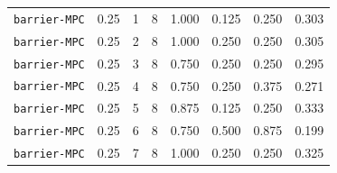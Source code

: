 \documentclass{article}
\begin{document}
\begin{center}
{\begin{tabular}{llllcccc}
\texttt{barrier-MPC} & 0.25 & 1 & 8 & 1.000 & 0.125 & 0.250 & 0.303 \\
\texttt{barrier-MPC} & 0.25 & 2 & 8 & 1.000 & 0.250 & 0.250 & 0.305 \\
\texttt{barrier-MPC} & 0.25 & 3 & 8 & 0.750 & 0.250 & 0.250 & 0.295 \\
\texttt{barrier-MPC} & 0.25 & 4 & 8 & 0.750 & 0.250 & 0.375 & 0.271 \\
\texttt{barrier-MPC} & 0.25 & 5 & 8 & 0.875 & 0.125 & 0.250 & 0.333 \\
\texttt{barrier-MPC} & 0.25 & 6 & 8 & 0.750 & 0.500 & 0.875 & 0.199 \\
\texttt{barrier-MPC} & 0.25 & 7 & 8 & 1.000 & 0.250 & 0.250 & 0.325 \\
\bottomrule
\end{tabular}%
}
\end{center}
\normalsize



\end{document}
